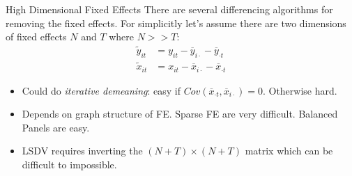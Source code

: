 \documentclass[aspectratio=169]{beamer}
\begin{document}
\begin{frame}{High Dimensional Fixed Effects}
There are several differencing algorithms for removing the fixed effects. For simplicitly let's assume there are two dimensions of fixed effects $N$ and $T$ where $N >> T$:
\begin{align*}
\tilde{y}_{it}&= y_{it} -\overline{y}_{i \cdot} - \overline{y}_{\cdot t}\\
\tilde{x}_{it}&= x_{it} -\overline{x}_{i \cdot} - \overline{x}_{\cdot t}
\end{align*}

\begin{itemize}
\item Could do \textit{iterative demeaning}: easy if $Cov(\overline{x}_{\cdot t},\overline{x}_{i \cdot})=0$. Otherwise hard.
\item Depends on \alert{graph structure} of FE. \alert{Sparse} FE are very difficult. \alert{Balanced Panels} are easy.
\item LSDV requires inverting the $(N+T) \times (N+T)$ matrix which can be difficult to impossible.
\end{itemize}
\end{frame}
\end{document}
